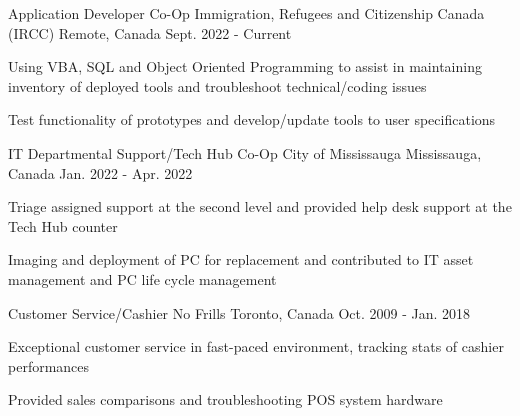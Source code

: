 \begin{cventries}
  \cventry
    {Application Developer Co-Op}
    {Immigration, Refugees and Citizenship Canada (IRCC)}
    {Remote, Canada}
    {Sept. 2022 - Current}
    {
      \begin{cvitems}
        \item {Using VBA, SQL and Object Oriented Programming to assist in maintaining inventory of deployed tools and troubleshoot technical/coding issues}
        \item {Test functionality of prototypes and develop/update tools to user specifications}
      \end{cvitems}
    }
      \cventry
    {IT Departmental Support/Tech Hub Co-Op}
    {City of Mississauga}
    {Mississauga, Canada}
    {Jan. 2022 - Apr. 2022}
    {
      \begin{cvitems}
        \item {Triage assigned support at the second level and provided help desk support at the Tech Hub counter}
        \item {Imaging and deployment of PC for replacement and contributed to IT asset management and PC life cycle management }
      \end{cvitems}
    }
  \cventry
    {Customer Service/Cashier}
    {No Frills}
    {Toronto, Canada}
    {Oct. 2009 - Jan. 2018}
    {
      \begin{cvitems}
        \item {Exceptional customer service in fast-paced environment, tracking stats of cashier performances}
        \item {Provided sales comparisons and troubleshooting POS system hardware}
      \end{cvitems}
    }
\end{cventries}